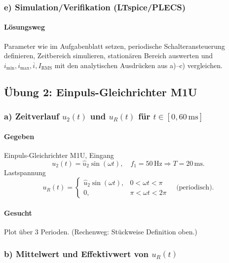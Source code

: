 
\subsubsection*{e) Simulation/Verifikation (LTspice/PLECS)}

\paragraph{Lösungsweg}
Parameter wie im Aufgabenblatt setzen, periodische Schalteransteuerung definieren,
Zeitbereich simulieren, stationären Bereich auswerten und $i_\mathrm{min},i_\mathrm{max},\overline{i},I_{\mathrm{RMS}}$
mit den analytischen Ausdrücken aus a)–c) vergleichen.



\subsection{Übung 2: Einpuls-Gleichrichter M1U }

\subsubsection*{a) Zeitverlauf $u_2(t)$ und $u_R(t)$ für $t\in[0,60\,\mathrm{ms}]$}

\paragraph{Gegeben}
Einpuls-Gleichrichter M1U, Eingang
\[
u_2(t)=\hat u_2\sin(\omega t),
\quad f_1=50\,\mathrm{Hz}\Rightarrow T=20\,\mathrm{ms}.
\]
Lastspannung
\[
u_R(t)=
\begin{cases}
\hat u_2\sin(\omega t), & 0<\omega t<\pi\\
0, & \pi<\omega t<2\pi
\end{cases}
\quad\text{(periodisch)}.
\]

\paragraph{Gesucht}
Plot über 3 Perioden. (Rechenweg: Stückweise Definition oben.)

\subsubsection*{b) Mittelwert und Effektivwert von $u_R(t)$}

